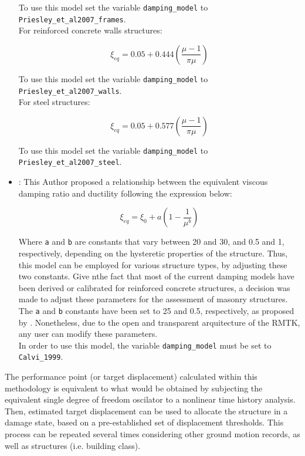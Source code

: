 \begin{itemize}
To use this model set the variable \verb=damping_model= to \verb=Priesley_et_al2007_frames=.\\

For reinforced concrete walls structures:

\begin{equation}
\xi_{eq} = 0.05 + 0.444\left(\frac{\mu-1}{\pi\mu}\right)
\end{equation}

To use this model set the variable \verb=damping_model= to \verb=Priesley_et_al2007_walls=.\\

For steel structures:

\begin{equation}
\xi_{eq} = 0.05 + 0.577\left(\frac{\mu-1}{\pi\mu}\right)
\end{equation}

To use this model set the variable \verb=damping_model= to \verb=Priesley_et_al2007_steel=.\\

\item \cite{Calvi1999}: This Author proposed a relationship between the equivalent viscous damping ratio and ductility following the expression below:

\begin{equation}
\xi_{eq} = \xi_0 + a\left(1-\frac{1}{\mu^b}\right)
\end{equation}

Where \verb=a= and \verb=b= are constants that vary between 20 and 30, and 0.5 and 1, respectively, depending on the hysteretic properties of the structure. Thus, this model can be employed for various structure types, by adjusting these two constants. Give nthe fact that most of the current damping models have been derived or calibrated for reinforced concrete structures, a decision was made to adjust these parameters for the assessment of masonry structures. The \verb=a= and \verb=b= constants have been set to 25 and 0.5, respectively, as proposed by \cite{BorziEtAl2008a}. Nonetheless, due to the open and transparent arquitecture of the RMTK, any user can modify these parameters.\\

In order to use this model, the variable \verb=damping_model= must be set to \verb=Calvi_1999=.\\

\end{itemize}

The performance point (or target displacement) calculated within this methodology is equivalent to what would be obtained by subjecting the equivalent single degree of freedom oscilator to a nonlinear time history analysis. Then, estimated target displacement can be used to allocate the structure in a damage state, based on a pre-established set of displacement thresholds. This process can be repeated several times considering other ground motion records, as well as structures (i.e. building class).\\


